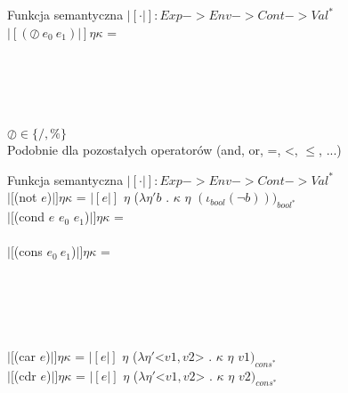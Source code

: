 \documentclass[12pt,serif]{beamer}
\begin{document}
\begin{frame}{Funkcja semantyczna}
$|[ \cdot |]: Exp -> Env -> Cont -> Val^{*}$ \newline
\\
$|[(\oslash~e_0~e_1)|] \eta \kappa$ = \\
\hspace{1em}{$|[e_0|]$ $\eta$ ($\lambda \eta_0 n_0$ .} \\
\hspace{2em}{$|[e_1|]$ $\eta$ ($\lambda \eta_1 n_1$ .} \\
 \\
 \\
 \newline
\\
$\oslash \in \{/,\%\}$ \newline
\\
\pause
Podobnie dla pozostałych operatorów (and, or, =, <, $\leq$, ...)
\end{frame}

\begin{frame}{Funkcja semantyczna}
$|[ \cdot |]: Exp -> Env -> Cont -> Val^{*}$ \newline
\\
$|[$(not $e$)$|] \eta \kappa$ =
  $|[e|]$ $\eta$ ($\lambda \eta' b$ . $\kappa$ $\eta$ $(\iota_{bool} (\neg b)))_{bool^{*}}$ \\
$|[$(cond $e$ $e_0$ $e_1$)$|] \eta \kappa$ = \\
 \newline
\\
$|[$(cons $e_0~e_1$)$|] \eta \kappa$ = \\
\hspace{1em}{$|[e_0|]$ $\eta$ ($\lambda \eta_0 v_0$ .} \\
\hspace{2em}{$|[e_1|]$ $\eta$ ($\lambda \eta_1 v_1$ .} \\
 \\
\hspace{2em}{)} \\
\hspace{1em}{)} \newline
\\
$|[$(car $e$)$|] \eta \kappa$ =
  $|[e|]$ $\eta$ ($\lambda \eta' $<$v1, v2$> . $\kappa$ $\eta$ $v1)_{cons^{*}}$ \\
$|[$(cdr $e$)$|] \eta \kappa$ =
  $|[e|]$ $\eta$ ($\lambda \eta' $<$v1, v2$> . $\kappa$ $\eta$ $v2)_{cons^{*}}$ \\
\end{frame}
\end{document}

